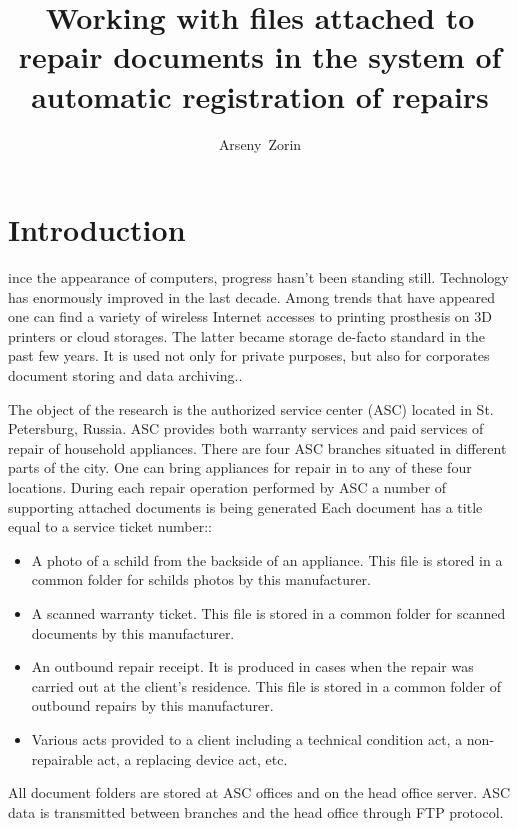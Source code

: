 \documentclass[12pt,journal,compsoc]{D:/Магистратура/English/bare_conf/IEEEtran}
\begin{document}
\title{Working with files attached to repair documents in the system of automatic registration of repairs}

\author{Arseny~Zorin}
\maketitle

\IEEEpeerreviewmaketitle



\section{Introduction}
ince the appearance of computers, progress hasn’t been  standing still. Technology has enormously improved in the last decade. Among trends that have appeared one can find a variety of wireless Internet accesses to printing prosthesis on 3D printers or cloud storages. The latter became storage de-facto standard in the past few years. It is used not only for private purposes, but also for corporates document storing and data archiving..

The object of the research is the authorized service center (ASC) located in St. Petersburg, Russia. ASC provides both warranty services and paid services of repair of household appliances. There are four ASC branches situated in different parts of the city. One can bring appliances for repair in to any of these four locations. During each repair operation performed by ASC a number of supporting attached documents is being generated  Each document has a title equal to a service ticket number::
\begin{itemize}
\item A photo of a schild from the backside of an appliance. This file is stored in a common folder for schilds photos by this manufacturer.
\item A scanned warranty ticket. This file is stored in a common folder for scanned documents by this manufacturer.
\item An outbound repair receipt. It is produced in cases when the repair was carried out at the client’s residence. This file is stored in a common folder of outbound repairs by this manufacturer.
\item Various acts provided to a client including a technical condition act, a non-repairable act, a replacing device act, etc. 
\end{itemize}

All document folders are stored at ASC offices and on the head office server. ASC data is transmitted between branches and the head office through FTP protocol.
\end{document}

